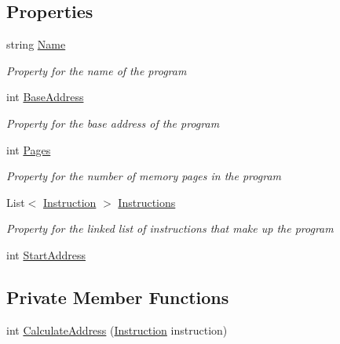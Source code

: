 \subsection*{Properties}
\begin{DoxyCompactItemize}
\item 
string \hyperlink{class_c_p_u___o_s___simulator_1_1_simulator_program_a1f86d599b2126d389a1ed956f98234b3}{Name}
\begin{DoxyCompactList}\small\item\em Property for the name of the program \end{DoxyCompactList}\item 
int \hyperlink{class_c_p_u___o_s___simulator_1_1_simulator_program_a568c9415fc2be2ba79154438aca2f932}{Base\+Address}
\begin{DoxyCompactList}\small\item\em Property for the base address of the program \end{DoxyCompactList}\item 
int \hyperlink{class_c_p_u___o_s___simulator_1_1_simulator_program_acb651f746bd98040b6b7a06637b83fa3}{Pages}
\begin{DoxyCompactList}\small\item\em Property for the number of memory pages in the program \end{DoxyCompactList}\item 
List$<$ \hyperlink{class_c_p_u___o_s___simulator_1_1_c_p_u_1_1_instruction}{Instruction} $>$ \hyperlink{class_c_p_u___o_s___simulator_1_1_simulator_program_a96c9aa54cc0d455ded271c13bc5c1bb0}{Instructions}
\begin{DoxyCompactList}\small\item\em Property for the linked list of instructions that make up the program \end{DoxyCompactList}\item 
int \hyperlink{class_c_p_u___o_s___simulator_1_1_simulator_program_afe1316429a20c7e678f8e4c0654dbacd}{Start\+Address}
\end{DoxyCompactItemize}
\subsection*{Private Member Functions}
\begin{DoxyCompactItemize}
\item 
int \hyperlink{class_c_p_u___o_s___simulator_1_1_simulator_program_a002d414bff9b08c0f2312c9da5df1c0c}{Calculate\+Address} (\hyperlink{class_c_p_u___o_s___simulator_1_1_c_p_u_1_1_instruction}{Instruction} instruction)
\end{DoxyCompactItemize}
